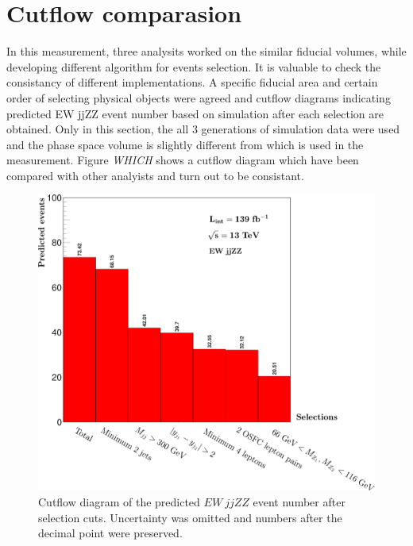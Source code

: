 \documentclass[12pt]{article}
\begin{document}
    \section{Cutflow comparasion}
        \par In this measurement, three analysits worked on the similar fiducial volumes, while developing different algorithm for events selection.
        It is valuable to check the consistancy of different implementations. A specific fiducial area and certain order of selecting physical objects were 
        agreed and cutflow diagrams indicating predicted EW jjZZ event number based on simulation after each selection are obtained. Only in this section, the all
        3 generations of simulation data were used and the phase space volume is slightly different from which is used in the measurement. 
        Figure \emph{WHICH} shows a cutflow diagram which have been compared with other analyists and turn out to be consistant.
        \begin{figure}[ht]
            \begin{centering}
            \includegraphics[scale=0.15]{cutflow_stack.png}
            \caption{Cutflow diagram of the predicted $EW\ jjZZ$ event number after selection cuts. Uncertainty was omitted and numbers 
            after the decimal point were preserved.}
            \end{centering}
        \end{figure}
\end{document}
